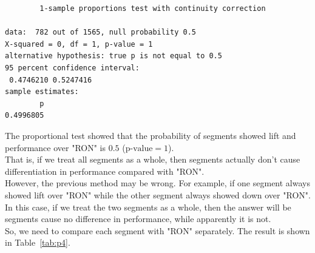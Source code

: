 \documentclass[12pt]{article}
\begin{document}
\begin{verbatim}
        1-sample proportions test with continuity correction

data:  782 out of 1565, null probability 0.5
X-squared = 0, df = 1, p-value = 1
alternative hypothesis: true p is not equal to 0.5
95 percent confidence interval:
 0.4746210 0.5247416
sample estimates:
        p
0.4996805
\end{verbatim}

The proportional test showed that the probability of segments showed lift and performance over "RON" is $0.5$ ($\text{p-value} = 1$). \\

That is, if we treat all segments as a whole, then segments actually don't cause differentiation in performance compared with "RON". \\

However, the previous method may be wrong. For example, if one segment always showed lift over "RON" while the other segment always showed down over "RON". In this case, if we treat the two segments as a whole, then the answer will be segments cause no difference in performance, while apparently it is not. \\

So, we need to compare each segment with "RON" separately. The result is shown in Table~\ref{tab:p4}. \\
\end{document}
